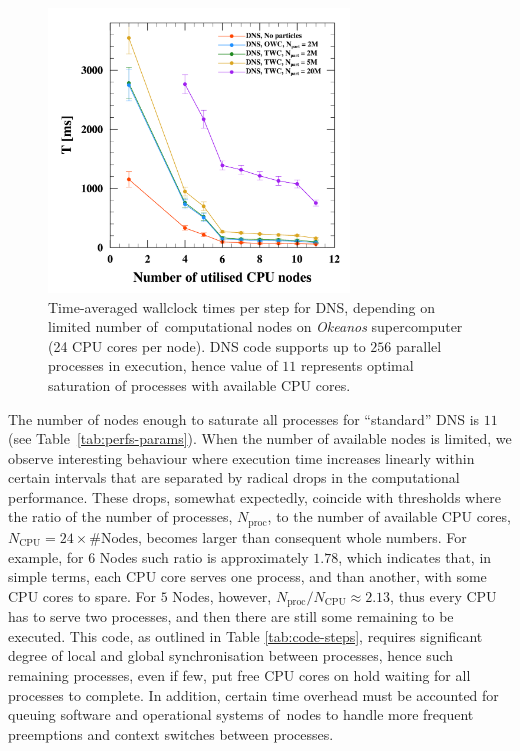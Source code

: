 \documentclass{pracamgren}
\begin{document}
\begin{figure}[h]
\centering
\includegraphics[width=8cm]{img/plots/3-2d-pfspfn.pdf}
\caption{
Time-averaged wallclock times per step for DNS, depending on limited number of~computational nodes on \emph{Okeanos} supercomputer (24 CPU cores per node).
DNS code supports up to $256$ parallel processes in execution, hence value of $11$ represents optimal saturation of processes with available CPU cores.
}
\label{fig:pfspfn}
\end{figure}

The number of nodes enough to saturate all processes for ``standard'' DNS is $11$ (see Table~\ref{tab:perfs-params}).
When the number of available nodes is limited, we observe interesting behaviour where execution time increases linearly within certain intervals that are separated by radical drops in the computational performance.
These drops, somewhat expectedly, coincide with thresholds where the ratio of the number of processes, $N_{\text{proc}}$, to the number of available CPU cores, $N_{\text{CPU}} = 24 \times \#\text{Nodes}$, becomes larger than consequent whole numbers.
For example, for $6$ Nodes such ratio is approximately $1.78$, which indicates that, in simple terms, each CPU core serves one process, and than another, with some CPU cores to spare.
For $5$ Nodes, however, $N_{\text{proc}} / N_{\text{CPU}} \approx 2.13$, thus every CPU has to serve two processes, and then there are still some remaining to be executed.
This code, as outlined in Table \ref{tab:code-steps}, requires significant degree of local and global synchronisation between processes, hence such remaining processes, even if few, put free CPU cores on hold waiting for all processes to complete. 
In addition, certain time overhead must be accounted for queuing software and operational systems of~nodes to handle more frequent preemptions and context switches between processes.
\end{document}
